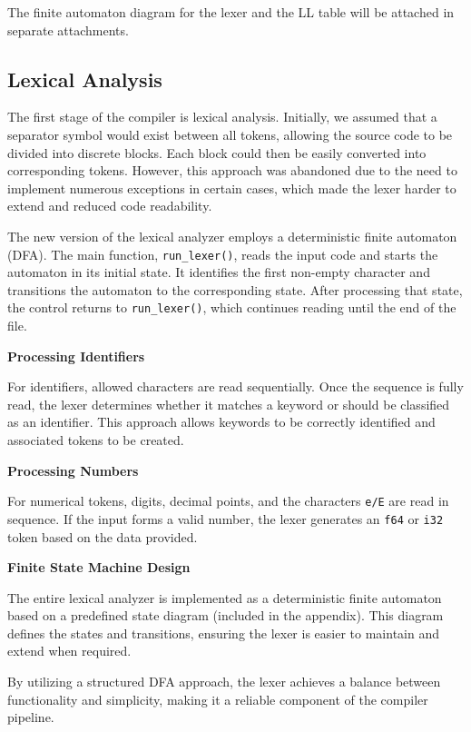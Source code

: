 \documentclass[a4paper, 11pt]{article}
\begin{document}
    The finite automaton diagram for the lexer and the LL table will be attached in separate attachments.

	\subsection{Lexical Analysis}

        The first stage of the compiler is lexical analysis. Initially, we assumed that a separator symbol would exist between all tokens, allowing the source code to be divided into discrete blocks. Each block could then be easily converted into corresponding tokens. However, this approach was abandoned due to the need to implement numerous exceptions in certain cases, which made the lexer harder to extend and reduced code readability.
        
        The new version of the lexical analyzer employs a deterministic finite automaton (DFA). The main function, \texttt{run\_lexer()}, reads the input code and starts the automaton in its initial state. It identifies the first non-empty character and transitions the automaton to the corresponding state. After processing that state, the control returns to \texttt{run\_lexer()}, which continues reading until the end of the file.
    
        \textbf{Processing Identifiers}
    
        For identifiers, allowed characters are read sequentially. Once the sequence is fully read, the lexer determines whether it matches a keyword or should be classified as an identifier. This approach allows keywords to be correctly identified and associated tokens to be created.
    
        \textbf{Processing Numbers}
    
        For numerical tokens, digits, decimal points, and the characters \texttt{e/E} are read in sequence. If the input forms a valid number, the lexer generates an \texttt{f64} or \texttt{i32} token based on the data provided.
        
        \textbf{Finite State Machine Design}
        
        The entire lexical analyzer is implemented as a deterministic finite automaton based on a predefined state diagram (included in the appendix). This diagram defines the states and transitions, ensuring the lexer is easier to maintain and extend when required.
        
        By utilizing a structured DFA approach, the lexer achieves a balance between functionality and simplicity, making it a reliable component of the compiler pipeline.
\end{document}
